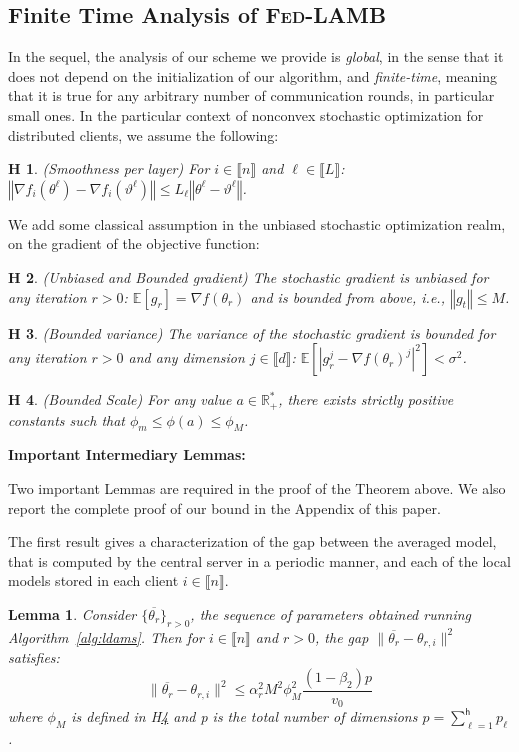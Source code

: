 \documentclass[11pt]{article}
\newtheorem{Lemma}{Lemma}
\newtheorem{assumption}{H\!\!}
\newcommand{\beq}{\begin{equation}}
\newcommand{\eeq}{\end{equation}}
\def\EE{\mathbb{E}}
\newcommand{\norm}[1]{\left\Vert #1 \right\Vert}
\def\rset{\ensuremath{\mathbb{R}}}
\newcommand{\inter}{\llbracket n \rrbracket}
\newcommand{\interl}{\llbracket L \rrbracket}
\def\tot{\mathsf{h}}
\newcommand{\algo}{\textsc{Fed-LAMB}}
\begin{document}
\subsection{Finite Time Analysis of \algo}
In the sequel, the analysis of our scheme we provide is \emph{global}, in the sense that it does not depend on the initialization of our algorithm, and \emph{finite-time}, meaning that it is true for any arbitrary number of communication rounds, in particular small ones.
In the particular context of nonconvex stochastic optimization for distributed clients, we assume the following:

\begin{assumption}\label{ass:smooth}(Smoothness per layer)
For $i \in \inter$ and $\ell \in \interl$: $\norm{\nabla f_i (\theta^\ell) - \nabla f_i (\vartheta^\ell)} \leq L_\ell \norm{\theta^\ell-\vartheta^\ell}$.
\end{assumption}
We add some classical assumption in the unbiased stochastic optimization realm, on the gradient of the objective function:
\begin{assumption}\label{ass:boundgrad}(Unbiased and Bounded gradient)
The stochastic gradient is unbiased for any iteration $r>0$: $\EE[g_r] = \nabla f(\theta_r)$ and is bounded from above, i.e., $\norm{g_t} \leq M$.
\end{assumption}

\begin{assumption}\label{ass:var}(Bounded variance)
The variance of the stochastic gradient is bounded for any iteration $r>0$ and any dimension $j \in \llbracket d \rrbracket$: $\EE[|g_r^j - \nabla f(\theta_r)^j|^2] < \sigma^2$.
\end{assumption}

\begin{assumption}\label{ass:phi}(Bounded Scale)
For any value $a \in \rset^*_+$, there exists strictly positive constants such that $\phi_m \leq  \phi(a) \leq \phi_M$.
\end{assumption}



\textbf{Important Intermediary Lemmas:}

Two important Lemmas are required in the proof of the Theorem above.
We also report the complete proof of our bound in the Appendix of this paper.

The first result gives a characterization of the gap between the averaged model, that is computed by the central server in a periodic manner, and each of the local models stored in each client $i \in \inter$.
\begin{Lemma}\label{lemma:iterates}
Consider $\{\overline{\theta_r}\}_{r>0}$, the sequence of parameters obtained running Algorithm~\ref{alg:ldams}. Then for $i \in \inter$ and $r > 0$, the gap $\| \overline{\theta_r} - \theta_{r,i} \|^2$ satisfies:
\beq
\| \overline{\theta_r} - \theta_{r,i} \|^2 \leq \alpha_r^2 M^2 \phi_M^2 \frac{(1-\beta_2)p}{v_0}
\eeq
where $\phi_M$ is defined in H\ref{ass:phi} and p is the total number of dimensions $p = \sum_{\ell = 1}^\tot p_\ell$.
\end{Lemma}
\end{document}

